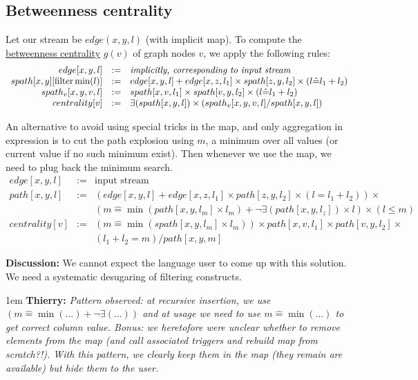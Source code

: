 \documentclass[10pt]{article}
\newlength{\dlen}
\def\discuss#1{\par\hspace{2em}
\setlength{\dlen}{\textwidth}
\addtolength{\dlen}{-2em}
\begin{minipage}{\dlen}\footnotesize {\bf\color{red} Discussion:} #1\end{minipage}\par}
\def\say#1#2{\begingroup\par\leftskip1em {\bf #1:} \it #2\par\endgroup}
\begin{document}
\subsection{Betweenness centrality}
Let our stream be $edge(x,y,l)$ (with implicit map). To compute the \href{http://en.wikipedia.org/wiki/Betweenness_centrality}{betweenness centrality} $g(v)$ of graph nodes $v$, we apply the following rules:
\[\begin{array}{rcl}
edge[x,y,l] &:=& \text{\it implicitly, corresponding to input stream} \\
spath[x,y][{\rm filter} \min(l)] &:=& edge[x,y,l] +  edge[x,z,l_1] \times spath[z,y,l_2] \times (l\hat= l_1+l_2)\\
spath_v[x,y,v,l] &:=& spath[x,v,l_1] \times spath[v,y,l_2] \times (l\hat= l_1+l_2)\\
centrality[v] &:=& \exists(spath[x,y,l]) \times (spath_v[x,y,v,l] / spath[x,y,l])
\end{array}\]

An alternative to avoid using special tricks in the map, and only aggregation in expression is to cut the path explosion using $m$, a minimum over all values (or current value if no such minimum exist). Then whenever we use the map, we need to plug back the minimum search.
\[\begin{array}{rcl}
edge[x,y,l] &:=& \text{input stream} \\
path[x,y,l] &:=& (edge[x,y,l] + edge[x,z,l_1]\times path[z,y,l_2] \times (l\hat=l_1+l_2)) \times \\
&& (m\hat=\min (path[x,y,l_m] \times l_m) + \neg\exists(path[x,y,l_z])\times l ) \times (l \le m) \\
centrality[v] &:=& (m\hat=\min (spath[x,y,l_m] \times l_m)) \times path[x,v,l_1] \times path[v,y,l_2] \times \\
&& (l_1+l_2=m) / path[x,y,m]
\end{array}\]
\discuss{We cannot expect the language user to come up with this solution. We need a systematic desugaring of filtering constructs.
\say{Thierry}{Pattern observed: at recursive insertion, we use $(m\hat=\min(...)+\neg\exists(...))$ and at usage we need to use $m\hat=\min(...)$ to get correct column value. Bonus: we heretofore were unclear whether to remove elements from the map (and call associated triggers and rebuild map from scratch?!). With this pattern, we clearly keep them in the map (they remain are available) but hide them to the user.}}

\end{document}
